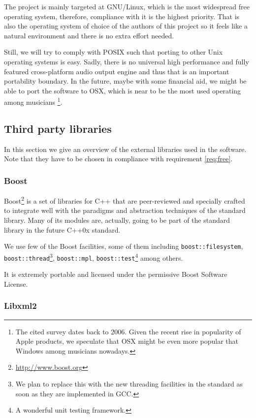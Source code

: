 The project is mainly targeted at GNU/Linux, which is the most
widespread free operating system, therefore, compliance with it is the
highest priority. That is also the operating system of choice of the
authors of this project so it feels like a natural environment and
there is no extra effort needed.

Still, we will try to comply with POSIX such that porting to other
Unix operating systems is easy. Sadly, there is no universal high
performance and fully featured cross-platform audio output engine and
thus that is an important portability boundary. In the future, maybe
with some financial aid, we might be able to port the software to OSX,
which is near to be the most used operating among
musicians \cite{magnusson07acoustic}\footnote{The cited survey dates
  back to 2006. Given the recent rise in popularity of Apple products,
  we speculate that OSX might be even more popular that Windows among
  musicians nowadays.}.

\subsection{Third party libraries}

In this section we give an overview of the external libraries used in
the software. Note that they have to be chosen in compliance with
requirement \ref{req:free}.

\subsubsection{Boost}

Boost\footnote{\url{http://www.boost.org}} is a set of libraries for
C++ that are peer-reviewed and specially crafted to integrate well
with the paradigms and abstraction techniques of the standard
library. Many of its modules are, actually, going to be part of the
standard library in the future C++0x standard. 

We use few of the Boost facilities, some of them including
\texttt{boost::filesystem}, \texttt{boost::thread}\footnote{We plan to
replace this with the new threading facilities in the standard as soon
as they are implemented in GCC.},
\texttt{boost::mpl}, \texttt{boost::test}\footnote{A wonderful unit
  testing framework.} among others.

It is extremely portable and licensed under the permissive Boost
Software License.

\subsubsection{Libxml2}

